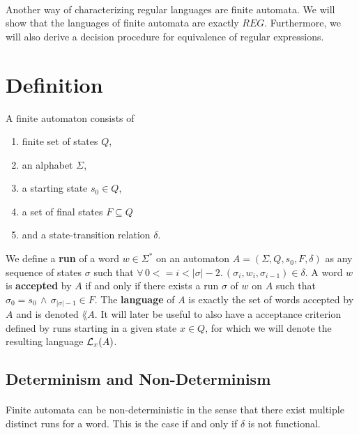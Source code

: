 \documentclass[11pt,a4paper,oneside]{book}
\begin{document}
        \paragraph{} 
        Another way of characterizing regular languages are finite automata. 
        We will show that the languages of finite automata are exactly $REG$. 
        Furthermore, we will also derive a decision procedure for equivalence of regular expressions.

        \section{Definition}
            A finite automaton consists of
            \begin{enumerate}
                \item
                    finite set of states $Q$, 
                \item 
                    an alphabet $\Sigma$, 
                \item 
                    a starting state $s_0 \in Q$, 
                \item 
                    a set of final states $F \subseteq Q$ 
                \item 
                    and a state-transition relation $\delta$. \cite{DBLP:books/daglib/0011126}
            \end{enumerate}

                We define a \textbf{run} of a word $w \in \Sigma^*$ on an automaton $A = (\Sigma, Q, s_0, F, \delta)$ as any sequence of states $\sigma$ such that 
                $\forall \, 0 <= i < \vert\sigma\vert-2. \, (\sigma_i, w_i, \sigma_{i-1}) \in \delta$.
            A word $w$ is \textbf{accepted} by $A$ if and only if there exists a run $\sigma$ of $w$ on $A$ such that $\sigma_0 = s_0 \, \wedge \, \sigma_{\vert\sigma\vert-1} \in F$.
            The \textbf{language} of $A$ is exactly the set of words accepted by $A$ and is denoted $\lang{A}$. 
            It will later be useful to also have a acceptance criterion defined by runs starting in a given state $x \in Q$, for which we will denote the resulting language $\mathcal{L}_x(A)$.

            \subsection{Determinism and Non-Determinism}
                \paragraph{} 
                Finite automata can be non-deterministic in the sense that there exist multiple distinct runs for a word. This is the case if and only if $\delta$ is not functional. 
\end{document}
